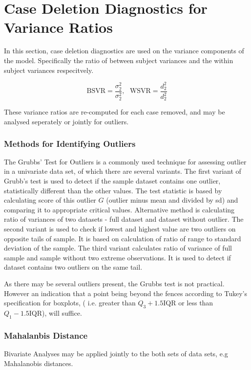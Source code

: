 \documentclass[12pt, a4paper]{report}
\theoremstyle{plain}
\theoremstyle{definition}
\theoremstyle{remark}
\begin{document}
\section{Case Deletion Diagnostics for Variance Ratios}
In this section, case deletion diagnostics are used on the variance components of the model. Specifically the ratio of between subject variances and the within subject variances respecitvely.


\[ \mbox{BSVR} = \frac{\sigma^2_2}{\sigma^2_2} , \mbox{   } \mbox{WSVR} = \frac{d^2_2}{d^2_2} \]

These variance ratios are re-computed for each case removed, and may be analysed seperately or jointly for outliers.

\subsubsection{Methods for Identifying Outliers}
The Grubbs' Test for Outliers is a commonly used technique for assessing outlier in a univariate data set, of which there are several variants. The first variant of Grubb's test is used to detect if the sample dataset contains one outlier, statistically different than
the other values. The test statistic is based by calculating score of this outlier $G$ (outlier minus mean and divided
by sd) and comparing it to appropriate critical values. Alternative method is calculating ratio of
variances of two datasets - full dataset and dataset without outlier. 
The second variant is used to check if lowest and highest value are two outliers on opposite tails of
sample. It is based on calculation of ratio of range to standard deviation of the sample.
The third variant calculates ratio of variance of full sample and sample without two extreme observations.
It is used to detect if dataset contains two outliers on the same tail.

As there may be several outliers present, the Grubbs test is not practical. However an indication that a point being beyond the fences according to Tukey's 
specification for boxplots, ( i.e. greater than $Q_3 +1.5 \mbox{IQR}$ or less than $Q_1 - 1.5 \mbox{IQR}$), will suffice.

\subsubsection{Mahalanbis Distance}
Bivariate Analyses may be applied jointly to the both sets of data sets, e.g Mahalanobis distances.
\end{document}
